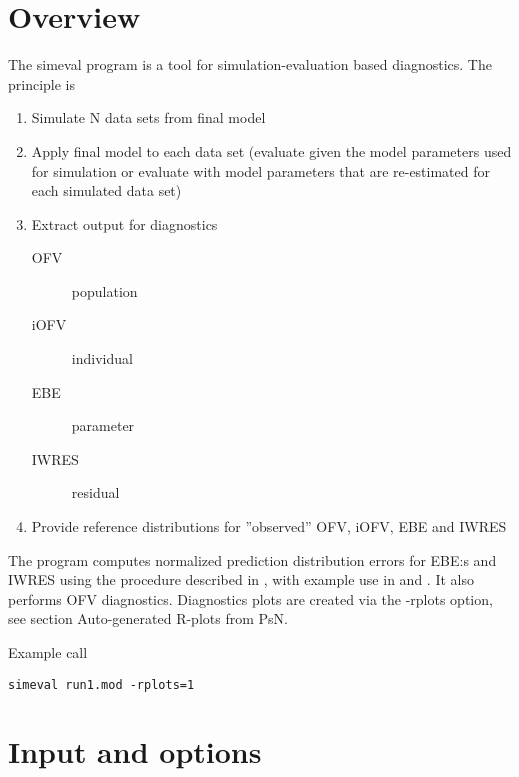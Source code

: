 



\maketitle
\newcommand{\guidetoolname}{simeval}


\section{Overview}

The simeval program is a tool for simulation-evaluation based diagnostics.
The principle is 
\begin{enumerate}
\item Simulate N data sets from final model
\item Apply final model to each data set
(evaluate given the model parameters used for simulation or evaluate with
model parameters that are re-estimated for each simulated data set)
\item Extract output for diagnostics
\begin{description}
\item[OFV] population
\item[iOFV] individual
\item[EBE] parameter
\item[IWRES] residual
\end{description}
\item Provide reference distributions for ”observed” OFV, iOFV, EBE and IWRES
\end{enumerate}
The program computes normalized prediction distribution errors for EBE:s and IWRES 
using the procedure described in \cite{Comets}, with example use in \cite{Keizer} and \cite{Largajolli}.
It also performs OFV diagnostics. Diagnostics plots are created via the -rplots option, see section 
Auto-generated R-plots from PsN.

Example call
\begin{verbatim}
simeval run1.mod -rplots=1
\end{verbatim}

\section{Input and options}

